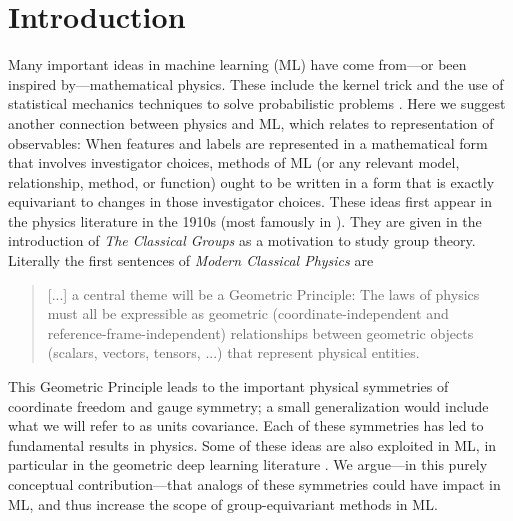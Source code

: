 \documentclass[preprint]{article} %
\begin{document}
\section{Introduction}\label{sec:intro}
Many important ideas in machine learning (ML) have come from---or been inspired by---mathematical physics.
These include the kernel trick \citep{CouHil53,SchSmo02} and the use of statistical mechanics techniques to solve probabilistic problems \citep{mcmc, gibbs}.
Here we suggest another connection between physics and ML, which relates to representation of observables:
When features and labels are represented in a mathematical form that involves investigator choices, methods of ML (or any relevant model, relationship, method, or function) ought to be written in a form that is exactly equivariant to changes in those investigator choices.
These ideas first appear in the physics literature in the 1910s (most famously in \citealt{gr}). They are given in the introduction of \textit{The Classical Groups} \citep{weyl} as a motivation to study group theory.
Literally the first sentences of \textit{Modern Classical Physics} \citep{mcp} are
\begin{quote}
[...] a central theme will be a Geometric Principle: 
The laws of physics must all
be expressible as geometric (coordinate-independent and reference-frame-independent)
relationships between geometric objects (scalars, vectors, tensors, ...) that represent
physical entities.
\end{quote}
This Geometric Principle leads to the important physical symmetries of coordinate freedom and gauge symmetry; a small generalization would include what we will refer to as units covariance.
Each of these symmetries has led to fundamental results in physics. Some of these ideas are also exploited in ML, in particular in the geometric deep learning literature \citep{bronstein2021geometric, weiler}. 
We argue---in this purely conceptual contribution---that analogs of these symmetries could have impact in ML, and thus increase the scope of group-equivariant methods in ML.
\end{document}
